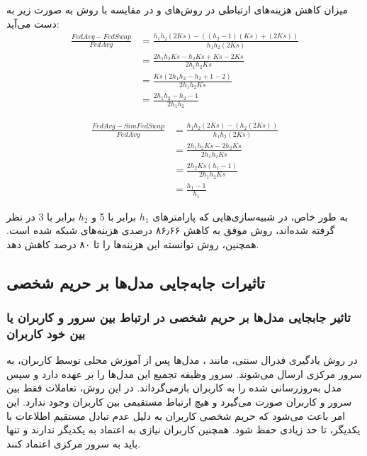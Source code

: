 میزان کاهش هزینه‌های ارتباطی در روش‌های  و  در مقایسه با روش  به صورت زیر به دست می‌آید:
\begingroup
\addtolength{\jot}{0.5em}
\begin{equation}
	\begin{aligned} 
		\frac{FedAvg-FedSwap}{FedAvg}
		&= \frac{h_1h_2(2Ks)-((h_2-1)(Ks)+(2Ks))}{h_1h_2(2Ks)} \\
		&= \frac{2h_1h_2Ks-h_2Ks+Ks-2Ks}{2h_1h_2Ks} \\
		&= \frac{Ks(2h_1h_2 -h_2 +1 -2)}{2h_1h_2Ks} \\
		&= \frac{2h_1h_2 -h_2 -1}{2h_1h_2}
	\end{aligned}
\end{equation}
\endgroup

\begingroup
\addtolength{\jot}{0.5em}
\begin{equation}
	\begin{aligned} 
		\frac{FedAvg-SimFedSwap}{FedAvg}
		&= \frac{h_1h_2(2Ks)-(h_2(2Ks))}{h_1h_2(2Ks)} \\
		&= \frac{2h_1h_2Ks-2h_2Ks}{2h_1h_2Ks} \\
		&= \frac{2h_2Ks(h_1 -1)}{2h_1h_2Ks} \\
		&= \frac{h_1 -1}{h_1}
	\end{aligned}
\end{equation}
\endgroup

به طور خاص، در شبیه‌سازی‌هایی که پارامترهای \(h_1\) برابر با 5 و \(h_2\) برابر با 3 در نظر گرفته شده‌اند، روش  موفق به کاهش
۸۶٫۶۶
درصدی هزینه‌های شبکه شده است. همچنین، روش  توانسته این هزینه‌ها را تا ۸۰ درصد کاهش دهد. 


\subsection{تاثیرات جابه‌جایی مدل‌ها بر حریم شخصی}
\vspace{3mm}
\subsubsection{تاثیر جابجایی مدل‌ها بر حریم شخصی در ارتباط بین سرور و کاربران یا بین خود کاربران}\vspace{-1mm}
در روش یادگیری فدرال سنتی، مانند
%
، مدل‌ها پس از آموزش محلی توسط کاربران، به سرور مرکزی ارسال می‌شوند. سرور وظیفه تجمیع این مدل‌ها را بر عهده دارد و سپس مدل به‌روزرسانی‌ شده را به کاربران بازمی‌گرداند. در این روش، تعاملات فقط بین سرور و کاربران صورت می‌گیرد و هیچ ارتباط مستقیمی بین کاربران وجود ندارد. این امر باعث می‌شود که حریم شخصی کاربران به دلیل عدم تبادل مستقیم اطلاعات با یکدیگر، تا حد زیادی حفظ شود. همچنین کاربران نیازی به اعتماد به یکدیگر ندارند و تنها باید به سرور مرکزی اعتماد کنند.

